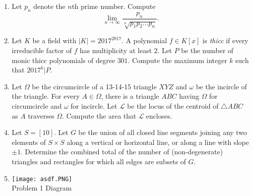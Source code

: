 \documentclass[12pt]{article}
\begin{document}
\begin{multicols}{2}
\begin{enumerate}
\item Let $p_n$ denote the $n$th prime number. Compute
\[
    \lim_{n \to \infty} \frac{p_n}{\sqrt[n]{p_1p_2...p_n}}.
\]

\item Let $K$ be a field with $|K| = 2017^{2017}$. A polynomial $f \in K[x]$ is \textit{thicc} if every irreducible factor of $f$ has multiplicity at least $2$. Let $P$ be the number of monic thicc polynomials of degree $301$. Compute the maximum integer $k$ such that $2017^{k} | P$.  

\item Let $\Omega$ be the circumcircle of a 13-14-15 triangle $XYZ$ and $\omega$ be the incircle of the triangle. For every $A \in \Omega$, there is a triangle $ABC$ having $\Omega$ for circumcircle and $\omega$ for incircle. Let $\mathcal{L}$ be the locus of the centroid of $\triangle ABC$ as $A$ traverses $\Omega$. Compute the area that $\mathcal{L}$ encloses. 

\item Let $S = [10]$. Let $G$ be the union of all closed line segments joining any two elements of $S \times S$ along a vertical or horizontal line, or along a line with slope $\pm 1$. Determine the combined total of the number of (non-degenerate) triangles and rectangles for which all edges are subsets of $G$. 

\item[] \centering \texttt{[image: asdf.PNG]} \\ Problem 1 Diagram
\end{enumerate}
\end{multicols}
\end{document}
